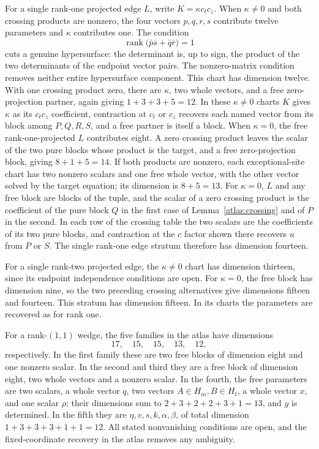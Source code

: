 \documentclass[11pt,letterpaper]{article}
\newcommand{\rk}{\operatorname{rank}}
\theoremstyle{definition}
\begin{document}
For a single rank-one projected edge \(L\), write
\(K=\kappa c_tc_z\). When \(\kappa\ne0\) and both crossing products are
nonzero, the four vectors \(p,q,r,s\) contribute twelve parameters and
\(\kappa\) contributes one. The condition
\[
 \rk\bigl(\bar p\bar s+\bar q\bar r\bigr)=1
\]
cuts a genuine hypersurface: the determinant is, up to sign, the product
of the two determinants of the endpoint vector pairs. The nonzero-matrix
condition removes neither entire hypersurface component. This chart has
dimension twelve. With one crossing product zero, there are \(\kappa\),
two whole vectors, and a free zero-projection partner, again giving
\(1+3+3+5=12\).
In these \(\kappa\ne0\) charts \(K\) gives \(\kappa\) as its \(c_tc_z\)
coefficient, contraction at \(c_t\) or \(c_z\) recovers each named vector
from its block among \(P,Q,R,S\), and a free partner is itself a block.
When \(\kappa=0\), the free rank-one-projected \(L\) contributes eight.
A zero crossing product leaves the scalar of the two pure blocks whose
product is the target, and a free zero-projection block, giving
\(8+1+5=14\). If both products are nonzero,
each exceptional-site chart has two nonzero scalars and one free whole
vector, with the other vector solved by the target equation; its
dimension is \(8+5=13\).
For \(\kappa=0\), \(L\) and any free block are blocks of the tuple, and
the scalar of a zero crossing product is the coefficient of the pure
block \(Q\) in the first case of Lemma~\ref{atlas:crossing} and of \(P\)
in the second. In each row of the crossing table the two scalars are the
coefficients of its two pure blocks, and contraction at the \(c\) factor
shown there recovers \(u\) from \(P\) or \(S\).
The single rank-one edge stratum therefore has dimension fourteen.

For a single rank-two projected edge, the \(\kappa\ne0\) chart has
dimension thirteen, since its endpoint independence conditions are open.
For \(\kappa=0\), the free block has dimension nine, so the two preceding
crossing alternatives give dimensions fifteen and fourteen.
This stratum has dimension fifteen.
In its charts the parameters are recovered as for rank one.

For a rank-\((1,1)\) wedge, the five families in the atlas have dimensions
\begin{equation}\label{geom:wedge-counts}
 17,\quad15,\quad15,\quad13,\quad12,
\end{equation}
respectively. In the first family these are two free blocks of dimension
eight and one nonzero scalar. In the second and third they are a free
block of dimension eight, two whole vectors and a nonzero scalar.
In the fourth, the free parameters are two scalars, a whole vector \(q\),
two vectors \(A\in H_m,B\in H_t\), a whole vector \(x\), and one scalar
\(\rho\); their dimensions sum to \(2+3+2+2+3+1=13\), and \(y\) is
determined. In the fifth they are \(\eta,v,s,k,\alpha,\beta\), of total
dimension \(1+3+3+3+1+1=12\).
All stated nonvanishing conditions are open, and the fixed-coordinate
recovery in the atlas removes any ambiguity.
\end{document}
